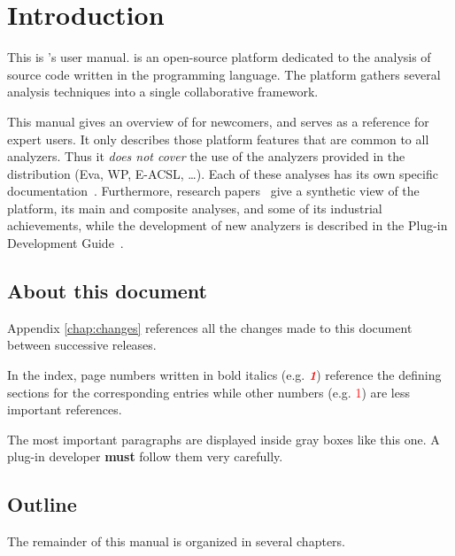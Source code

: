 \chapter{Introduction}
\label{user-intro}

This is \FramaC's user manual. 
\FramaC is an open-source platform dedicated to
the analysis of source code written in the  programming
language. The \FramaC platform gathers several analysis techniques into
a single collaborative framework. 

This manual gives an overview of \FramaC for newcomers, 
and serves as a reference for expert users.
It only describes those platform features that are common to all analyzers. 
Thus it \emph{does not cover} the use of the analyzers provided in the \FramaC
distribution (Eva, WP, E-ACSL, \ldots). Each of these analyses has its
own specific documentation~\cite{wp,value,eacsl}. Furthermore, research
papers~\cite{sefm12,fac15} give a synthetic view of the platform, its main and
composite analyses, and some of its industrial achievements, while the
development of new analyzers is described in the Plug-in Development
Guide~\cite{plugin-dev-guide}.

\section{About this document}

Appendix \ref{chap:changes} references all the changes made to this document
between successive \FramaC releases.

In the index, page numbers written in bold italics (e.g.  
\textcolor{red}{\textit{\textbf{1}}}) reference the defining sections for the
corresponding entries while other numbers (e.g. \textcolor{red}{1}) are
less important references. 

\begin{important}
The most important paragraphs are displayed inside gray boxes like this one.
A plug-in developer \textbf{must} follow them very carefully.
\end{important}

\section{Outline}

The remainder of this manual is organized in several chapters. 

